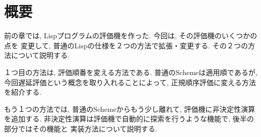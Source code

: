 
%
\author{Daniel Perez}
%

\maketitle
%
\section*{概要}
%
前の章では, Lispプログラムの評価機を作った. 今回は, その評価機のいくつかの点を
変更して, 普通のLispの仕様を２つの方法で拡張・変更する.
その２つの方法について説明する.

１つ目の方法は, 評価順番を変える方法である. 普通のSchemeは適用順であるが,
今回遅延評価という概念を取り入れることによって, 正規順序評価に変える方法を紹介する.

もう１つの方法では, 普通のSchemeからもう少し離れて, 評価機に非決定性演算を追加する.
非決定性演算は評価機で自動的に探索を行うような機能で, 後半の部分ではその機能と
実装方法について説明する.



%
% 
%

